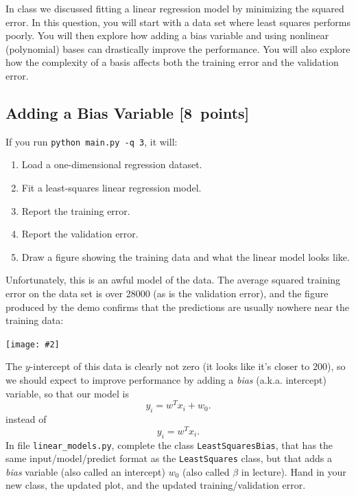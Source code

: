 \documentclass{article}
\newcommand{\blu}[1]{{\textcolor{blu}{#1}}}
\let\ask\blu
\newcommand\pts[1]{\textcolor{pointscolour}{[#1~points]}}
\newcommand{\centerfig}[2]{\begin{center}\texttt{[image: \#2]}\end{center}}
\begin{document}
In class we discussed fitting a linear regression model by minimizing the squared error.
In this question, you will start with a data set where least squares performs poorly.
You will then explore how adding a bias variable and using nonlinear (polynomial) bases can drastically improve the performance.
You will also explore how the complexity of a basis affects both the training error and the validation error.

\subsection{Adding a Bias Variable \pts{8}}

\label{biasvar}
If you run  \verb|python main.py -q 3|, it will:
\begin{enumerate}
\item Load a one-dimensional regression dataset.
\item Fit a least-squares linear regression model.
\item Report the training error.
\item Report the validation error.
\item Draw a figure showing the training data and what the linear model looks like.
\end{enumerate}
Unfortunately, this is an awful model of the data. The average squared training error on the data set is over 28000
(as is the validation error), and the figure produced by the demo confirms that the predictions are usually nowhere near
 the training data:
\centerfig{.5}{./figs/least_squares_no_bias.pdf}
The $y$-intercept of this data is clearly not zero (it looks like it's closer to $200$),
so we should expect to improve performance by adding a \emph{bias} (a.k.a. intercept) variable, so that our model is
\[
y_i = w^Tx_i + w_0.
\]
instead of
\[
y_i = w^Tx_i.
\]
\ask{In file \texttt{linear\string_models.py}, complete the class \texttt{LeastSquaresBias},
that has the same input/model/predict format as the \texttt{LeastSquares} class,
but that adds a \emph{bias} variable (also called an intercept) $w_0$ (also called $\beta$ in lecture). Hand in your new class, the updated plot,
and the updated training/validation error.}
\end{document}
